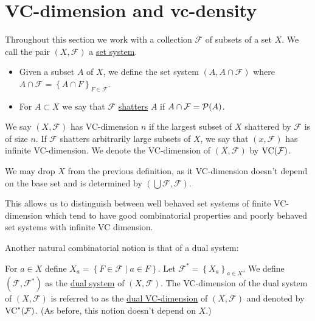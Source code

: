 \documentclass{amsart}
\newcommand{\F}{\mathcal F}
\newcommand{\curly}[1]{\left\{#1\right\}}
\newcommand{\defn}{\underline}
\begin{document}

\section{VC-dimension and vc-density}




\begin{Definition}
  Throughout this section we work with a collection $\F$ of subsets of a set $X$.
  We call the pair $(X, \F)$ a \defn{set system}.
  \begin{itemize}
  \item Given a subset $A$ of $X$, we define the set system $(A, A \cap \F)$
    where $A \cap \F = \curly{A \cap F}_{F\in \F}$.
  \item For $A \subset X$ we say that $\F$ \defn{shatters} $A$ if $A \cap \F = \PP(A)$.
  \end{itemize}    
\end{Definition}  

\begin{Definition}
  We say $(X, \F)$ has VC-dimension $n$ if the largest subset of $X$ shattered by $\F$ is of size $n$.
  If $\F$ shatters arbitrarily large subsets of $X$, we say that $(x, \F)$ has infinite VC-dimension.
  We denote the VC-dimension of $(X, \F)$ by $\VC(\F)$.
\end{Definition}  

\begin{Note}
  We may drop $X$ from the previous definition, as it VC-dimension doesn't depend on the base set and is determined by $(\bigcup \F, \F)$.
\end{Note}
This allows us to distinguish between well behaved set systems of finite VC-dimension which tend to have good combinatorial properties and
poorly behaved set systems with infinite VC dimension.

Another natural combinatorial notion is that of a dual system:
\begin{Definition}
  For $a \in X$ define $X_a = \curly{F \in \F \mid a \in F}$.
  Let $\F^* = \curly{X_a}_{a \in X}$.
  We define $(\F, \F^*)$ as the \defn{dual system} of $(X, \F)$.
  The VC-dimension of the dual system of $(X, \F)$ is referred to as the \defn{dual VC-dimension} of $(X, \F)$ and denoted by $\VC^*(\F)$.
  (As before, this notion doesn't depend on $X$.)
\end{Definition}  
\end{document}
